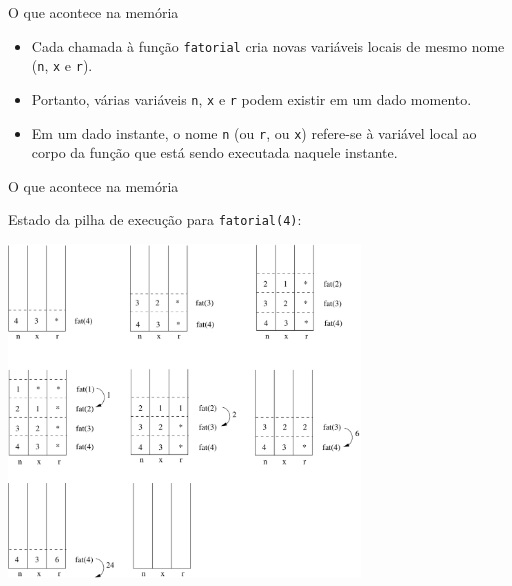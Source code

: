 \documentclass[handout]{beamer}
\newcommand{\cod}[1]{\texttt{#1}}
\begin{document}
\begin{frame}[fragile]{O que acontece na memória}

    \begin{itemize}[<+->]
        \item Cada chamada à função \cod{fatorial} cria novas variáveis locais de mesmo nome (\cod{n}, \cod{x} e \cod{r}).
        \item Portanto, várias variáveis \cod{n}, \cod{x} e \cod{r} podem existir em um dado momento.
        \item Em um dado instante, o nome \cod{n} (ou \cod{r}, ou \cod{x}) refere-se à variável local ao corpo da função que está sendo executada naquele instante.
    \end{itemize}
\end{frame}

\begin{frame}[fragile]{O que acontece na memória}

    Estado da pilha de execução para \cod{fatorial(4)}:
    \begin{center}
        \includegraphics[width=0.7\textwidth]{figs/fatorial}
    \end{center}
\end{frame}
\end{document}
